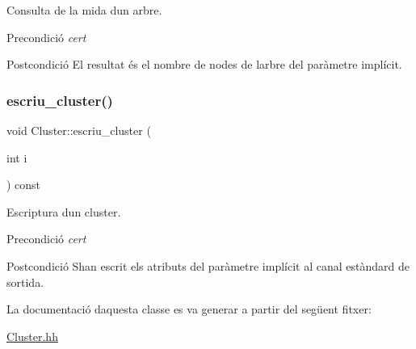 Consulta de la mida d\textquotesingle{}un arbre. 

\begin{DoxyPrecond}{Precondició}
{\itshape cert} 
\end{DoxyPrecond}
\begin{DoxyPostcond}{Postcondició}
El resultat és el nombre de nodes de l\textquotesingle{}arbre del paràmetre implícit. 
\end{DoxyPostcond}
\mbox{\label{class_cluster_a965f3fd78351c4eb06864f4811993823}} 
\subsubsection{\texorpdfstring{escriu\+\_\+cluster()}{escriu\_cluster()}}
{\footnotesize\ttfamily void Cluster\+::escriu\+\_\+cluster (\begin{DoxyParamCaption}\item[{int}]{i }\end{DoxyParamCaption}) const}



Escriptura d\textquotesingle{}un cluster. 

\begin{DoxyPrecond}{Precondició}
{\itshape cert} 
\end{DoxyPrecond}
\begin{DoxyPostcond}{Postcondició}
S\textquotesingle{}han escrit els atributs del paràmetre implícit al canal estàndard de sortida. 
\end{DoxyPostcond}


La documentació d\textquotesingle{}aquesta classe es va generar a partir del següent fitxer\+:\begin{DoxyCompactItemize}
\item 
\hyperlink{_cluster_8hh}{Cluster.\+hh}\end{DoxyCompactItemize}
